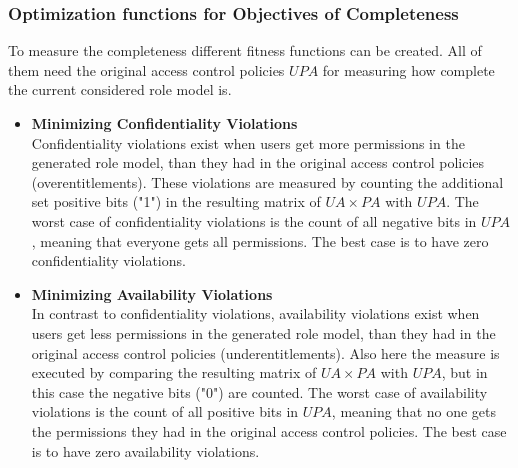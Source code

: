         \subsubsection{Optimization functions for Objectives of Completeness}
        To measure the completeness different fitness functions can be created. All of them need the original access control policies $UPA$ for measuring how complete the current considered role model is.
        \begin{itemize}
            \item \textbf{Minimizing Confidentiality Violations}\\
            Confidentiality violations exist when users get more permissions in the generated role model, than they had in the original access control policies (overentitlements). These violations are measured by counting the additional set positive bits ("1") in the resulting matrix of $UA \times PA$ with $UPA$. The worst case of confidentiality violations is the count of all negative bits in $UPA$, meaning that everyone gets all permissions. The best case is to have zero confidentiality violations.
            \item \textbf{Minimizing Availability Violations}\\
            In contrast to confidentiality violations, availability violations exist when users get less permissions in the generated role model, than they had in the original access control policies (underentitlements). Also here the measure is executed by comparing the resulting matrix of $UA \times PA$ with $UPA$, but in this case the negative bits ("0") are counted. The worst case of availability violations is the count of all positive bits in $UPA$, meaning that no one gets the permissions they had in the original access control policies. The best case is to have zero availability violations.

\end{itemize}
